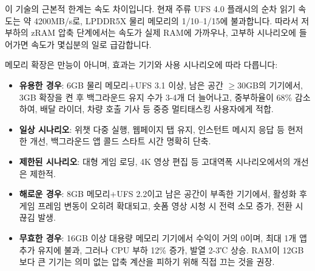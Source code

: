 이 기술의 근본적 한계는 속도 차이입니다. 현재 주류 UFS 4.0 플래시의 순차 읽기 속도는 약 4200MB/s로, LPDDR5X 물리 메모리의 1/10–1/15에 불과합니다. 따라서 저부하의 zRAM 압축 단계에서는 속도가 실제 RAM에 가까우나, 고부하 시나리오에 들어가면 속도가 몇십분의 일로 급감합니다.


메모리 확장은 만능이 아니며, 효과는 기기와 사용 시나리오에 따라 다릅니다:

\begin{itemize}
  \item \textbf{유용한 경우}: 6GB 물리 메모리+UFS 3.1 이상, 남은 공간 $\geq$30GB의 기기에서, 3GB 확장을 켠 후 백그라운드 유지 수가 3-4개 더 늘어나고, 중부하율이 68\% 감소하여, 배달 라이더, 차량 호출 기사 등 중증 멀티태스킹 사용자에게 적합.
  \item \textbf{일상 시나리오}: 위챗 다중 실행, 웹페이지 탭 유지, 인스턴트 메시지 응답 등 현저한 개선, 백그라운드 앱 콜드 스타트 시간 명확히 단축.
  \item \textbf{제한된 시나리오}: 대형 게임 로딩, 4K 영상 편집 등 고대역폭 시나리오에서의 개선은 제한적.
  \item \textbf{해로운 경우}: 8GB 메모리+UFS 2.2이고 남은 공간이 부족한 기기에서, 활성화 후 게임 프레임 변동이 오히려 확대되고, 숏폼 영상 시청 시 전력 소모 증가, 전환 시 끊김 발생.
  \item \textbf{무효한 경우}: 16GB 이상 대용량 메모리 기기에서 수익이 거의 0이며, 최대 1개 앱 추가 유지에 불과, 그러나 CPU 부하 12\% 증가, 발열 2-3℃ 상승. RAM이 12GB보다 큰 기기는 의미 없는 압축 계산을 피하기 위해 직접 끄는 것을 권장.
\end{itemize}


